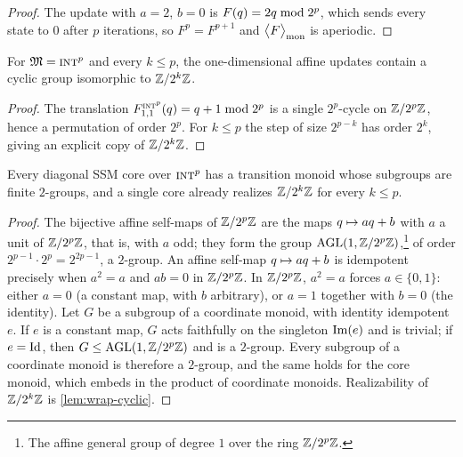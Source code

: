 \documentclass{article}
\begin{document}
\begin{proof}
The update with $a = 2$, $b = 0$ is $F(q) = 2q \bmod 2^p$, which sends every state to $0$ after $p$ iterations, so $F^p = F^{p+1}$ and $\bigl\langle F \bigr\rangle_{\mathrm{mon}}$ is aperiodic.
\end{proof}

\begin{lemma}\label{lem:wrap-cyclic}
For $\mathfrak{M} = \textsc{int}^p$ and every $k \le p$, the one-dimensional affine updates contain a cyclic group isomorphic to $\mathbb{Z}/{2^k}\mathbb{Z}$.
\end{lemma}

\begin{proof}
The translation $F_{1,1}^{\textsc{int}^p}(q) = q + 1 \bmod 2^p$ is a single $2^p$-cycle on $\mathbb{Z}/2^p\mathbb{Z}$, hence a permutation of order $2^p$.
For $k \le p$ the step of size $2^{p-k}$ has order $2^k$, giving an explicit copy of $\mathbb{Z}/{2^k}\mathbb{Z}$.
\end{proof}

\begin{corollary}\label{cor:uint-2group}
Every diagonal SSM core over $\textsc{int}^p$ has a transition monoid whose subgroups are finite $2$-groups, and a single core already realizes $\mathbb{Z}/{2^k}\mathbb{Z}$ for every $k \le p$.
\end{corollary}

\begin{proof}
The bijective affine self-maps of $\mathbb{Z}/2^p\mathbb{Z}$ are the maps $q \mapsto aq + b$ with $a$ a unit of $\mathbb{Z}/2^p\mathbb{Z}$, that is, with $a$ odd; they form the group $\mathrm{AGL}(1, \mathbb{Z}/2^p\mathbb{Z})$,\footnote{The affine general group of degree $1$ over the ring $\mathbb{Z}/2^p\mathbb{Z}$.} of order $2^{p-1} \cdot 2^p = 2^{2p-1}$, a $2$-group.
An affine self-map $q \mapsto aq + b$ is idempotent precisely when $a^2 = a$ and $ab = 0$ in $\mathbb{Z}/2^p\mathbb{Z}$.
In $\mathbb{Z}/2^p\mathbb{Z}$, $a^2 = a$ forces $a \in \{0, 1\}$: either $a = 0$ (a constant map, with $b$ arbitrary), or $a = 1$ together with $b = 0$ (the identity).
Let $G$ be a subgroup of a coordinate monoid, with identity idempotent $e$.
If $e$ is a constant map, $G$ acts faithfully on the singleton $\mathop{\mathrm{Im}}(e)$ and is trivial; if $e = \mathrm{Id}$, then $G \le \mathrm{AGL}(1, \mathbb{Z}/2^p\mathbb{Z})$ and is a $2$-group.
Every subgroup of a coordinate monoid is therefore a $2$-group, and the same holds for the core monoid, which embeds in the product of coordinate monoids.
Realizability of $\mathbb{Z}/{2^k}\mathbb{Z}$ is \cref{lem:wrap-cyclic}.
\end{proof}
\end{document}
